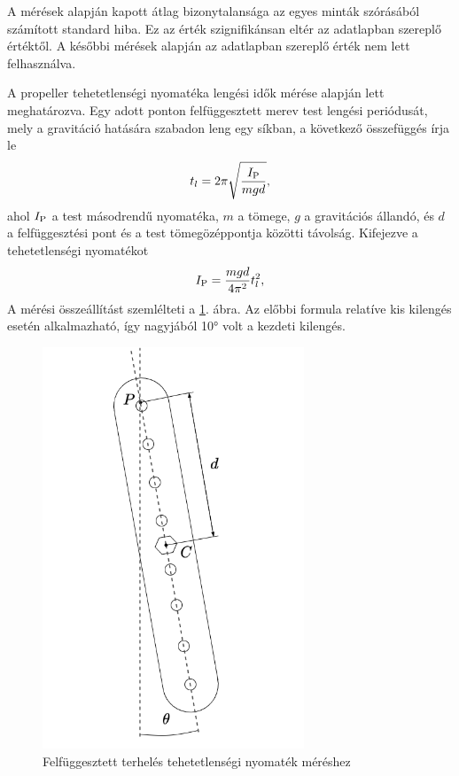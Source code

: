 A mérések alapján kapott átlag bizonytalansága az egyes minták szórásából számított 
standard hiba. Ez az érték szignifikánsan eltér az adatlapban szereplő értéktől. A 
későbbi mérések alapján az adatlapban szereplő érték nem lett felhasználva.

A propeller tehetetlenségi nyomatéka lengési idők mérése alapján lett meghatározva. Egy 
adott ponton felfüggesztett merev test lengési periódusát, mely a gravitáció hatására 
szabadon leng egy síkban, a következő összefüggés írja le
\begin{equation}
    t_l = 2\pi\sqrt{\frac{I_{\mathrm{P}}}{mgd}},
\end{equation}
ahol \(I_{\mathrm{P}}\) a test másodrendű nyomatéka, \(m\) a tömege, \(g\) a gravitációs állandó, 
és \(d\) a felfüggesztési pont és a test tömegözéppontja közötti távolság. 
Kifejezve a tehetetlenségi nyomatékot 
\begin{equation}
    I_{\mathrm{P}} = \frac{mgd}{4\pi^2}t^2_l,
\end{equation}
A mérési összeállítást szemlélteti a \ref{fig:propeller_pendulum}. ábra. Az 
előbbi formula relatíve kis kilengés esetén alkalmazható, így nagyjából 
10° volt a kezdeti kilengés.
\begin{figure}[H]
    \begin{center}
    \includegraphics[height=12cm]{images/impedance_control_propeller.png}
    \caption{Felfüggesztett terhelés tehetetlenségi nyomaték méréshez}\label{fig:propeller_pendulum}
    \end{center}
\end{figure}
